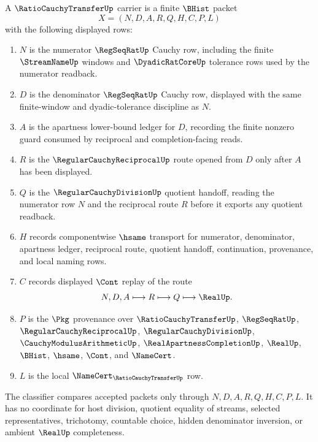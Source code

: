 \begin{definition}
\label{def:ratio-cauchy-transfer-carrier}
A $\RatioCauchyTransferUp$ carrier is a finite $\BHist$ packet
$$
X=(N,D,A,R,Q,H,C,P,L)
$$
with the following displayed rows:
\begin{enumerate}
\item $N$ is the numerator $\RegSeqRatUp$ Cauchy row, including the finite $\StreamNameUp$ windows and $\DyadicRatCoreUp$ tolerance rows used by the numerator readback.
\item $D$ is the denominator $\RegSeqRatUp$ Cauchy row, displayed with the same finite-window and dyadic-tolerance discipline as $N$.
\item $A$ is the apartness lower-bound ledger for $D$, recording the finite nonzero guard consumed by reciprocal and completion-facing reads.
\item $R$ is the $\RegularCauchyReciprocalUp$ route opened from $D$ only after $A$ has been displayed.
\item $Q$ is the $\RegularCauchyDivisionUp$ quotient handoff, reading the numerator row $N$ and the reciprocal route $R$ before it exports any quotient readback.
\item $H$ records componentwise $\hsame$ transport for numerator, denominator, apartness ledger, reciprocal route, quotient handoff, continuation, provenance, and local naming rows.
\item $C$ records displayed $\Cont$ replay of the route
$$
N,D,A \longmapsto R \longmapsto Q \longmapsto \RealUp .
$$
\item $P$ is the $\Pkg$ provenance over $\RatioCauchyTransferUp$, $\RegSeqRatUp$, $\RegularCauchyReciprocalUp$, $\RegularCauchyDivisionUp$, $\CauchyModulusArithmeticUp$, $\RealApartnessCompletionUp$, $\RealUp$, $\BHist$, $\hsame$, $\Cont$, and $\NameCert$.
\item $L$ is the local $\NameCert_{\RatioCauchyTransferUp}$ row.
\end{enumerate}
The classifier compares accepted packets only through $N,D,A,R,Q,H,C,P,L$. It has no coordinate for host division, quotient equality of streams, selected representatives, trichotomy, countable choice, hidden denominator inversion, or ambient $\RealUp$ completeness.
\end{definition}


